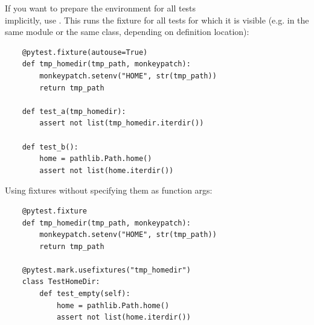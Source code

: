 
If you want to prepare the environment for all tests \\ implicitly, use .
This runs the fixture for all tests for which it is visible (e.g. in the same module or the same class, depending on definition location):

\begin{verbatim}
    @pytest.fixture(autouse=True)
    def tmp_homedir(tmp_path, monkeypatch):
        monkeypatch.setenv("HOME", str(tmp_path))
        return tmp_path

    def test_a(tmp_homedir):
        assert not list(tmp_homedir.iterdir())

    def test_b():
        home = pathlib.Path.home()
        assert not list(home.iterdir())
\end{verbatim}

Using fixtures without specifying them as function args:

\begin{verbatim}
    @pytest.fixture
    def tmp_homedir(tmp_path, monkeypatch):
        monkeypatch.setenv("HOME", str(tmp_path))
        return tmp_path

    @pytest.mark.usefixtures("tmp_homedir")
    class TestHomeDir:
        def test_empty(self):
            home = pathlib.Path.home()
            assert not list(home.iterdir())
\end{verbatim}

